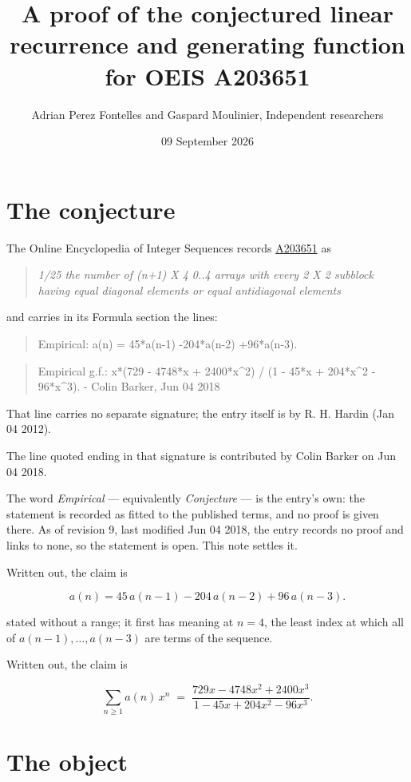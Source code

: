 \documentclass[11pt]{article}
\title{A proof of the conjectured linear recurrence and generating function for OEIS A203651}
\author{Adrian Perez Fontelles and Gaspard Moulinier, Independent researchers}
\date{09 September 2026}
\theoremstyle{definition}
\begin{document}
\maketitle
\section{The conjecture}

The Online Encyclopedia of Integer Sequences records \href{https://oeis.org/A203651}{A203651} as

\begin{quote}\itshape 1/25 the number of (n+1) X 4 0..4 arrays with every 2 X 2 subblock having equal diagonal elements or equal antidiagonal elements\end{quote}

and carries in its Formula section the lines:

\begin{quote}\ttfamily Empirical: a(n) = 45*a(n-1) -204*a(n-2) +96*a(n-3).\end{quote}

\begin{quote}\ttfamily Empirical g.f.: x*(729 - 4748*x + 2400*x\textasciicircum{}2) / (1 - 45*x + 204*x\textasciicircum{}2 - 96*x\textasciicircum{}3). - Colin Barker, Jun 04 2018\end{quote}

That line carries no separate signature; the entry itself is by R. H. Hardin (Jan 04 2012).

The line quoted ending in that signature is contributed by Colin Barker on Jun 04 2018.

The word {\itshape Empirical} --- equivalently {\itshape Conjecture} --- is the entry's own: the statement is recorded as fitted to the published terms, and no proof is given there. As of revision 9, last modified Jun 04 2018, the entry records no proof and links to none, so the statement is open. This note settles it.

Written out, the claim is

\[a(n) = 45\,a(n-1) - 204\,a(n-2) + 96\,a(n-3).\]

stated without a range; it first has meaning at $n = 4$, the least index at which all of $a(n-1),\dots,a(n-3)$ are terms of the sequence.

Written out, the claim is

\[\sum_{n \ge 1} a(n)\,x^n \;=\; \frac{729x - 4748x^{2} + 2400x^{3}}{1 - 45x + 204x^{2} - 96x^{3}}.\]

\section{The object}
\end{document}

